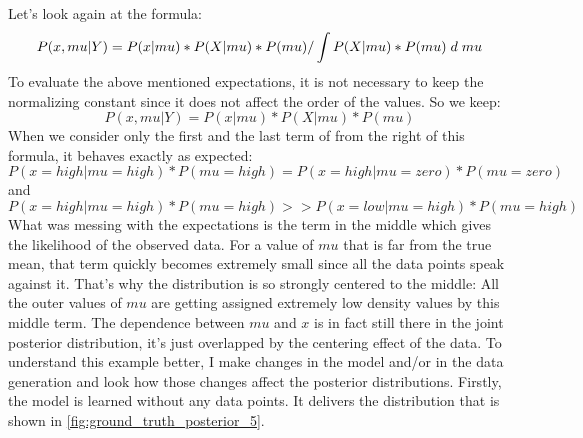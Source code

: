 \documentclass{article}
\begin{document}
Let's look again at the formula:
\begin{equation}
P(x,mu|Y) = P(x|mu) * P(X|mu) * P(mu) / \int P(X|mu) * P(mu) \hspace{1mm} d \hspace{1mm} mu
\end{equation}
To evaluate the above mentioned expectations, it is not necessary to keep the normalizing constant since it does not affect the order of the values. So we keep:
\begin{equation}
P(x,mu|Y) = P(x|mu) * P(X|mu) * P(mu)
\end{equation}
When we consider only the first and the last term of from the right of this formula, it behaves exactly as expected: \begin{equation}
P(x=high|mu=high)*P(mu=high) = P(x=high|mu=zero)*P(mu=zero)
\end{equation}
and 
\begin{equation}
P(x=high|mu=high)*P(mu=high) >> P(x=low|mu=high)*P(mu=high)
\end{equation} What was messing with the expectations is the term in the middle which gives the likelihood of the observed data. For a value of $mu$ that is far from the true mean, that term quickly becomes extremely small since all the data points speak against it. That's why the distribution is so strongly centered to the middle: All the outer values of $mu$ are getting assigned extremely low density values by this middle term. 
The dependence between $mu$ and $x$ is in fact still there in the joint posterior distribution, it's just overlapped by the centering effect of the data. To understand this example better, I make changes in the model and/or in the data generation and look how those changes affect the posterior distributions. Firstly, the model is learned without any data points. It delivers the distribution that is shown in \autoref{fig:ground_truth_posterior_5}.
\end{document}
